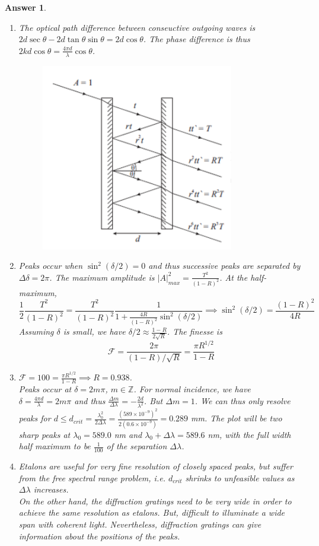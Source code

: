 \documentclass[a4paper]{article}
\newtheorem{ans}{Answer}[subsection]
\theoremstyle{new}
\begin{document}
\begin{ans}\leavevmode
\begin{enumerate}[label=(\alph*)]
\item The optical path difference between conseuctive outgoing waves is $2d\sec\theta-2d\tan\theta\sin\theta=2d\cos\theta$. The phase difference is thus $2kd\cos\theta=\frac{4\pi d}{\lambda}\cos\theta$.
\begin{figure}[H]
    \centering
    \includegraphics[scale=0.75]{2019P2B6.PNG}
\end{figure}
\item Peaks occur when $\sin^2(\delta/2)=0$ and thus successive peaks are separated by $\Delta\delta=2\pi$. The maximum amplitude is $|A|_{max}^2=\frac{T^2}{(1-R)^2}$. At the half-maximum,
$$\frac{1}{2}\frac{T^2}{(1-R)^2}=\frac{T^2}{(1-R)^2}\frac{1}{1+\frac{4R}{(1-R)^2}\sin^2(\delta/2)}\implies\sin^2(\delta/2)=\frac{(1-R)^2}{4R}$$
Assuming $\delta$ is small, we have $\delta/2\approx\frac{1-R}{2\sqrt{R}}$. The finesse is
$$\mathcal{F}=\frac{2\pi}{(1-R)/\sqrt{R}}=\frac{\pi R^{1/2}}{1-R}$$
\item $\mathcal{F}=100=\frac{\pi R^{1/2}}{1-R}\implies R=0.938$.\\[5pt]
Peaks occur at $\delta=2m\pi$, $m\in\mathbb{Z}$. For normal incidence, we have $\delta=\frac{4\pi d}{\lambda}=2m\pi$ and thus $\frac{\Delta m}{\Delta\lambda}=-\frac{2d}{\lambda^2}$. But $\Delta m=1$. We can thus only resolve peaks for $d\leq d_{crit}=\frac{\lambda_0^2}{2\Delta\lambda}=\frac{(589\times10^{-9})^2}{2(0.6\times10^{-9})}=0.289$ mm. The plot will be two sharp peaks at $\lambda_0=589.0$ nm and $\lambda_0+\Delta\lambda=589.6$ nm, with the full width half maximum to be $\frac{1}{100}$ of the separation $\Delta\lambda$.
\item Etalons are useful for very fine resolution of closely spaced peaks, but suffer from the free spectral range problem, i.e. $d_{crit}$ shrinks to unfeasible values as $\Delta\lambda$ increases.\\[5pt]
On the other hand, the diffraction gratings need to be very wide in order to achieve the same resolution as etalons. But, difficult to illuminate a wide span with coherent light. Nevertheless, diffraction gratings can give information about the positions of the peaks.
\end{enumerate}
\end{ans}
\end{document}
